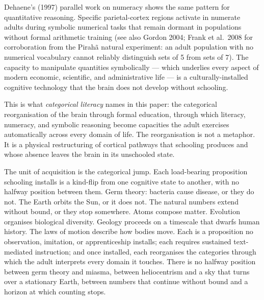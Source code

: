 \documentclass[12pt,letterpaper]{article}
\begin{document}
Dehaene's (1997) parallel work on numeracy shows the same pattern for
quantitative reasoning. Specific parietal-cortex regions activate in
numerate adults during symbolic numerical tasks that remain dormant
in populations without formal arithmetic training (see also Gordon
2004; Frank et al.\ 2008 for corroboration from the Pirahã natural
experiment: an adult population with no numerical vocabulary cannot
reliably distinguish sets of 5 from sets of 7). The capacity to
manipulate quantities symbolically --- which underlies every aspect
of modern economic, scientific, and administrative life --- is a
culturally-installed cognitive technology that the brain does not
develop without schooling.

This is what \emph{categorical literacy} names in this paper: the
categorical reorganisation of the brain through formal education,
through which literacy, numeracy, and symbolic reasoning become
capacities the adult exercises automatically across every domain of
life. The reorganisation is not a metaphor. It is a physical
restructuring of cortical pathways that schooling produces and whose
absence leaves the brain in its unschooled state.

The unit of acquisition is the categorical jump. Each load-bearing
proposition schooling installs is a kind-flip from one cognitive
state to another, with no halfway position between them. Germ
theory: bacteria cause disease, or they do not. The Earth orbits
the Sun, or it does not. The natural numbers extend without bound,
or they stop somewhere. Atoms compose matter. Evolution organises
biological diversity. Geology proceeds on a timescale that dwarfs
human history. The laws of motion describe how bodies move. Each
is a proposition no observation, imitation, or apprenticeship
installs; each requires sustained text-mediated instruction; and
once installed, each reorganises the categories through which the
adult interprets every domain it touches. There is no halfway
position between germ theory and miasma, between heliocentrism and
a sky that turns over a stationary Earth, between numbers that
continue without bound and a horizon at which counting stops.
\end{document}
